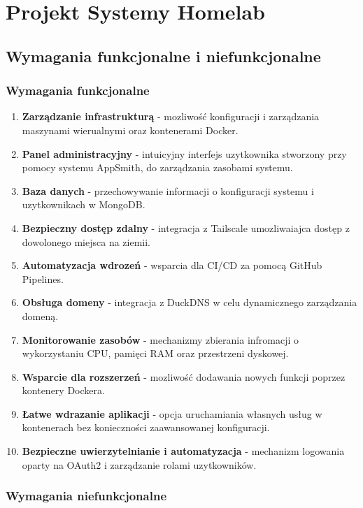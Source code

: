\chapter{Projekt Systemy Homelab}

\section{Wymagania funkcjonalne i niefunkcjonalne}

\subsection{Wymagania funkcjonalne}

\begin{enumerate}
    \item \textbf{Zarządzanie infrastrukturą} - mozliwość konfiguracji i zarządzania maszynami wierualnymi oraz kontenerami Docker.
    \item \textbf{Panel administracyjny} - intuicyjny interfejs uzytkownika stworzony przy pomocy systemu AppSmith, do zarządzania zasobami systemu.
    \item \textbf{Baza danych} - przechowywanie informacji o konfiguracji systemu i uzytkownikach w MongoDB.
    \item \textbf{Bezpieczny dostęp zdalny} - integracja z Tailscale umozliwaiajca dostęp z dowolonego miejsca na ziemii.
    \item \textbf{Automatyzacja wdrozeń} - wsparcia dla CI/CD za pomocą GitHub Pipelines.
    \item \textbf{Obsługa domeny} - integracja z DuckDNS w celu dynamicznego zarządzania domeną.
    \item \textbf{Monitorowanie zasobów} - mechanizmy zbierania infromacji o wykorzystaniu CPU, pamięci RAM oraz przestrzeni dyskowej.
    \item \textbf{Wsparcie dla rozszerzeń} - mozliwość dodawania nowych funkcji poprzez kontenery Dockera.
    \item \textbf{Łatwe wdrazanie aplikacji} - opcja uruchamiania własnych usług w kontenerach bez konieczności zaawansowanej konfiguracji.
    \item \textbf{Bezpieczne uwierzytelnianie i automatyzacja} - mechanizm logowania oparty na OAuth2 i zarządzanie rolami uzytkowników.
\end{enumerate}

\pagebreak

\subsection{Wymagania niefunkcjonalne}


